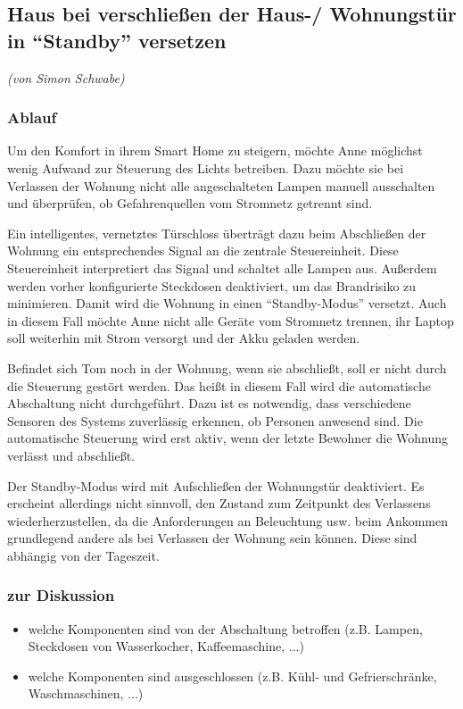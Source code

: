 \subsection{Haus bei verschließen der Haus-/ Wohnungstür in "`Standby"' versetzen}
\label{subsec:szenarioStandby}
\emph{(von Simon Schwabe)}
\subsubsection{Ablauf}
Um den Komfort in ihrem Smart Home zu steigern, möchte Anne möglichst wenig Aufwand zur Steuerung des Lichts betreiben. Dazu möchte sie bei Verlassen der Wohnung nicht alle angeschalteten Lampen manuell ausschalten und überprüfen, ob Gefahrenquellen vom Stromnetz getrennt sind.

Ein intelligentes, vernetztes Türschloss überträgt dazu beim Abschließen der Wohnung ein entsprechendes Signal an die zentrale Steuereinheit. Diese Steuereinheit interpretiert das Signal und schaltet alle Lampen aus. Außerdem werden vorher konfigurierte Steckdosen deaktiviert, um das Brandrisiko zu minimieren. Damit wird die Wohnung in einen "`Standby-Modus"' versetzt. Auch in diesem Fall möchte Anne nicht alle Geräte vom Stromnetz trennen, ihr Laptop soll weiterhin mit Strom versorgt und der Akku geladen werden.

Befindet sich Tom noch in der Wohnung, wenn sie abschließt, soll er nicht durch die Steuerung gestört werden. Das heißt in diesem Fall wird die automatische Abschaltung nicht durchgeführt. Dazu ist es notwendig, dass verschiedene Sensoren des Systems zuverlässig erkennen, ob Personen anwesend sind. Die automatische Steuerung wird erst aktiv, wenn der letzte Bewohner die Wohnung verlässt und abschließt.

Der Standby-Modus wird mit Aufschließen der Wohnungstür deaktiviert. Es erscheint allerdings nicht sinnvoll, den Zustand zum Zeitpunkt des Verlassens wiederherzustellen, da die Anforderungen an Beleuchtung usw. beim Ankommen grundlegend andere als bei Verlassen der Wohnung sein können. Diese sind abhängig von der Tageszeit.

\subsubsection{zur Diskussion}
\begin{itemize}
	\item welche Komponenten sind von der Abschaltung betroffen (z.B. Lampen, Steckdosen von Wasserkocher, Kaffeemaschine, ...)
	\item welche Komponenten sind ausgeschlossen (z.B. Kühl- und Gefrierschränke, Waschmaschinen, ...)
\end{itemize}

